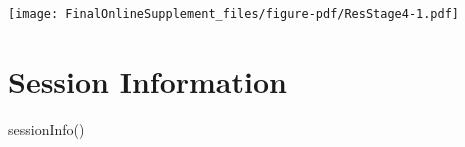 \documentclass[
  letterpaper,
  DIV=11,
  numbers=noendperiod]{scrartcl}
\newenvironment{Shaded}{\begin{snugshade}}{\end{snugshade}}
\newcommand{\CommentTok}[1]{\textcolor[rgb]{0.37,0.37,0.37}{#1}}
\newcommand{\FunctionTok}[1]{\textcolor[rgb]{0.28,0.35,0.67}{#1}}
\newcommand{\NormalTok}[1]{\textcolor[rgb]{0.00,0.23,0.31}{#1}}
\begin{document}
\texttt{[image: FinalOnlineSupplement\_files/figure-pdf/ResStage4-1.pdf]}

\begin{Shaded}
\end{Shaded}

\section{Session Information}\label{session-information}

\begin{Shaded}
\begin{Highlighting}[]
\FunctionTok{sessionInfo}\NormalTok{()}
\end{Highlighting}
\end{Shaded}
\end{document}
